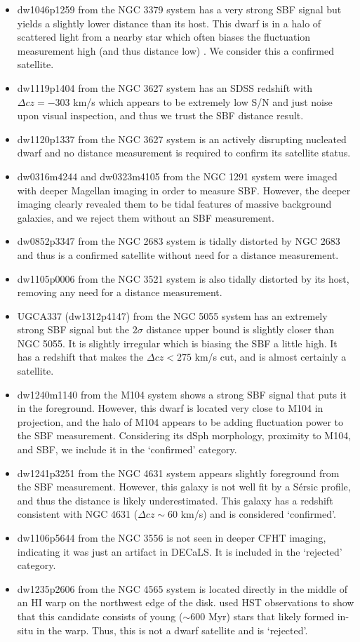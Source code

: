 \documentclass[twocolumn]{aastex62}
\begin{document}
\begin{itemize}
    \item dw1046p1259 from the NGC 3379 system has a very strong SBF signal but yields a slightly lower distance than its host. This dwarf is in a halo of scattered light from a nearby star which often biases the fluctuation measurement high (and thus distance low) \citep{carlsten2020b}. We consider this a confirmed satellite.
    \item dw1119p1404 from the NGC 3627 system has an SDSS redshift with $\Delta cz = -303$ km/s which appears to be extremely low S/N and just noise upon visual inspection, and thus we trust the SBF distance result.
    \item dw1120p1337 from the NGC 3627 system is an actively disrupting nucleated dwarf \citep[see, e.g.,][]{jennings2015} and no distance measurement is required to confirm its satellite status.
    \item dw0316m4244 and dw0323m4105 from the NGC 1291 system were imaged with deeper Magellan imaging in order to measure SBF. However, the deeper imaging clearly revealed them to be tidal features of massive background galaxies, and we reject them without an SBF measurement.
    \item dw0852p3347 from the NGC 2683 system is tidally distorted by NGC 2683 and thus is a confirmed satellite without need for a distance measurement.
    \item dw1105p0006 from the NGC 3521 system is also tidally distorted by its host, removing any need for a distance measurement.
    \item UGCA337 (dw1312p4147) from the NGC 5055 system has an extremely strong SBF signal but the $2\sigma$ distance upper bound is slightly closer than NGC 5055. It is slightly irregular which is biasing the SBF a little high. It has a redshift that makes the $\Delta cz <275$ km/s cut, and is almost certainly a satellite.
    \item dw1240m1140 from the M104 system shows a strong SBF signal that puts it in the foreground. However, this dwarf is located very close to M104 in projection, and the halo of M104 appears to be adding fluctuation power to the SBF measurement. Considering its dSph morphology, proximity to M104, and SBF, we include it in the `confirmed' category.
    \item dw1241p3251 from the NGC 4631 system appears slightly foreground from the SBF measurement. However, this galaxy is not well fit by a S\'{e}rsic profile, and thus the distance is likely underestimated. This galaxy has a redshift consistent with NGC 4631 ($\Delta cz\sim60$ km/s) and is considered `confirmed'.
    \item dw1106p5644 from the NGC 3556 is not seen in deeper CFHT imaging, indicating it was just an artifact in DECaLS. It is included in the `rejected' category.
    \item dw1235p2606 from the NGC 4565 system is located directly in the middle of an H\textsc{I} warp on the northwest edge of the disk. \citet{radburn2014} used HST observations to show that this candidate consists of young ($\sim600$ Myr) stars that likely formed in-situ in the warp. Thus, this is not a dwarf satellite and is `rejected'.
    

\end{itemize}
\end{document}
